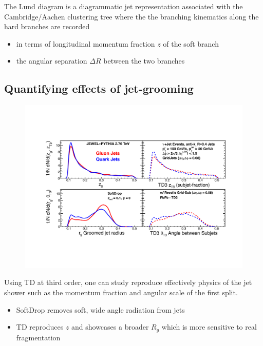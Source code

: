 \documentclass[final]{beamer}
\newcommand{\jw}{\textsc{Jewel}~}
\begin{document}
\begin{frame}[t]
\begin{multicols}{3}
	The Lund diagram is a diagrammatic jet representation associated with the Cambridge/Aachen clustering tree where the the branching kinematics along the hard branches are recorded
	\begin{itemize}
	\item in terms of longitudinal momentum fraction $z$ of the soft branch
	\item the angular separation $\Delta R$ between the two branches
	\end{itemize}


	\subsection{Quantifying effects of jet-grooming}

	\begin{figure}[t]
	   \centering
	   \includegraphics[width=0.9\columnwidth]{Figures/softdrop_vs_td_zgrg}
	   \label{fig:softdrop_zgrg}
	\end{figure}

	Using TD at third order, one can study reproduce effectively physics of the jet shower such as the momentum fraction and angular scale of the first split. 
	\begin{itemize}
	\item SoftDrop removes soft, wide angle radiation from jets
	\item TD reproduces $z$ and showcases a broader $R_{g}$ which is more sensitive to real fragmentation
	\end{itemize}


\end{multicols}
\end{frame}
\end{document}
